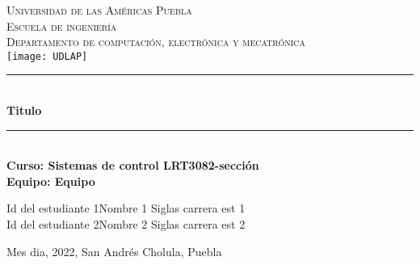 \documentclass[12pt]{article}  %
\def\titulo{Titulo}%
\def\materia{Curso: Sistemas de control LRT3082-sección} %
\def\fecha{Mes dia, 2022} %
\def\equipo {Equipo}%
\def\ida{Id del estudiante 1} %
\def\esta{Nombre 1}
\def\lica{Siglas carrera est 1}%
\def\idb{Id del estudiante 2}
\def\estb{Nombre 2}
\def\licb{Siglas carrera est 2}%
\begin{document}
\begin{center}														
\newcommand{\HRule}{\rule{\linewidth}{0.5mm}}						
\thispagestyle{empty} 												
\vspace*{-1.5cm}								
\textsc{\huge Universidad de las Américas Puebla}\\[1.5cm]	
\textsc{\LARGE Escuela de ingeniería}\\[1.5cm]	
\textsc{\LARGE Departamento de computación, electrónica y mecatrónica}\\[1.5cm]												
\texttt{[image: UDLAP]}  									\vspace*{1cm}														\HRule \\[0.4cm]												
{ \huge \bfseries \titulo}\\[0.4cm]	
\HRule \\[1cm]														
{ \Large \bfseries \materia}\\[1cm] 	
{ \Large \bfseries Equipo: \equipo}\\[1cm] 							
\begin{flushleft} \Large											
\ida \hspace{0.5cm}\esta \hspace{0.5cm} \lica\\
\idb \hspace{0.5cm}\estb \hspace{0.5cm} \licb\\
\end{flushleft}														
\vfill																
\begin{center}													
{\Large  \fecha, San Andrés Cholula, Puebla}						
\end{center}												 		
\end{center}							 								\newpage						
\setcounter{page}{1} %
\end{document}
